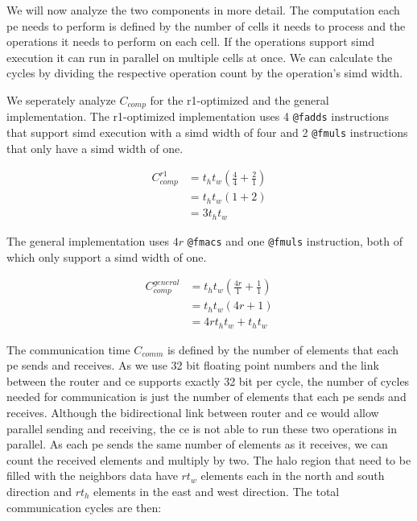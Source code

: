 We will now analyze the two components in more detail. The computation each \ac{pe} needs to perform is defined by the number of cells it needs to process and the operations it needs to perform on each cell. If the operations support \ac{simd} execution it can run in parallel on multiple cells at once. We can calculate the cycles by dividing the respective operation count by the operation's \ac{simd} width.

We seperately analyze $C_{comp}$ for the r1-optimized and the general implementation. The r1-optimized implementation uses 4 \texttt{@fadds} instructions that support \ac{simd} execution with a \ac{simd} width of four and 2 \texttt{@fmuls} instructions that only have a \ac{simd} width of one.

\begin{equation}
    \begin{aligned}
        \label{eq:c_comp_r1}
        C_{comp}^{r1} &= t_h t_w \left(\frac{4}{4} + \frac{2}{1}\right) \\
        &= t_h t_w \left(1 + 2\right) \\
        &= 3 t_h t_w
    \end{aligned}
\end{equation}

The general implementation uses $4r$ \texttt{@fmacs} and one \texttt{@fmuls} instruction, both of which only support a \ac{simd} width of one.

\begin{equation}
    \label{eq:c_comp_general}
    \begin{aligned}
        C_{comp}^{general} &= t_h t_w \left(\frac{4r}{1} + \frac{1}{1}\right) \\
        &= t_h t_w \left(4r + 1\right) \\
        &= 4r t_h t_w + t_h t_w
    \end{aligned}
\end{equation}


The communication time $C_{comm}$ is defined by the number of elements that each \ac{pe} sends and receives. As we use 32 bit floating point numbers and the link between the router and \ac{ce} supports exactly 32 bit per cycle, the number of cycles needed for communication is just the number of elements that each \ac{pe} sends and receives. Although the bidirectional link between router and \ac{ce} would allow parallel sending and receiving, the \ac{ce} is not able to run these two operations in parallel. As each \ac{pe} sends the same number of elements as it receives, we can count the received elements and multiply by two. The halo region that need to be filled with the neighbors data have $r t_w$ elements each in the north and south direction and $r t_h$ elements in the east and west direction. The total communication cycles are then:

